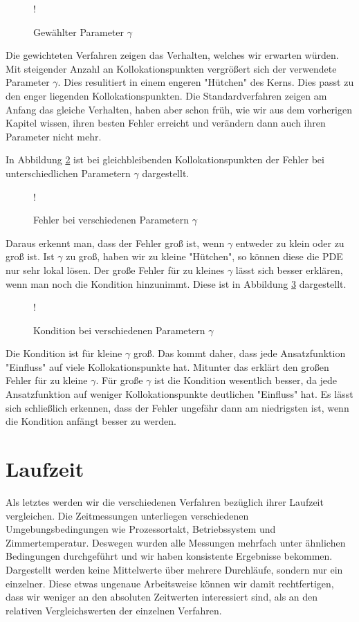 \begin{figure}[ht]
\centering
\resizebox {\columnwidth} {!} {

}
\caption{Gewählter Parameter $\gamma$}
\label{fig:gamma}
\end{figure}

Die gewichteten Verfahren zeigen das Verhalten, welches wir erwarten würden. Mit steigender Anzahl an Kollokationspunkten vergrößert sich der verwendete Parameter $\gamma$. Dies resulitiert in einem engeren "Hütchen" des Kerns. Dies passt zu den enger liegenden Kollokationspunkten. Die Standardverfahren zeigen am Anfang das gleiche Verhalten, haben aber schon früh, wie wir aus dem vorherigen Kapitel wissen, ihren besten Fehler erreicht und verändern dann auch ihren Parameter nicht mehr.

In Abbildung \ref{fig:gamma-fehler} ist bei gleichbleibenden Kollokationspunkten der Fehler bei unterschiedlichen Parametern $\gamma$ dargestellt.

\begin{figure}[ht]
\centering
\resizebox {\columnwidth} {!} {

}
\caption{Fehler bei verschiedenen Parametern $\gamma$}
\label{fig:gamma-fehler}
\end{figure}

Daraus erkennt man, dass der Fehler groß ist, wenn $\gamma$ entweder zu klein oder zu groß ist. Ist $\gamma$ zu groß, haben wir zu kleine "Hütchen", so können diese die \ac{PDE} nur sehr lokal lösen. Der große Fehler für zu kleines $\gamma$ lässt sich besser erklären, wenn man noch die Kondition hinzunimmt. Diese ist in Abbildung \ref{fig:kondition} dargestellt.

\begin{figure}[ht]
\centering
\resizebox {\columnwidth} {!} {

}
\caption{Kondition bei verschiedenen Parametern $\gamma$}
\label{fig:kondition}
\end{figure}

Die Kondition ist für kleine $\gamma$ groß. Das kommt daher, dass jede Ansatzfunktion "Einfluss" auf viele Kollokationspunkte hat. Mitunter das erklärt den großen Fehler für zu kleine $\gamma$. Für große $\gamma$ ist die Kondition wesentlich besser, da jede Ansatzfunktion auf weniger Kollokationspunkte deutlichen "Einfluss" hat. Es lässt sich schließlich erkennen, dass der Fehler ungefähr dann am niedrigsten ist, wenn die Kondition anfängt besser zu werden. 

\section{Laufzeit}
Als letztes werden wir die verschiedenen Verfahren bezüglich ihrer Laufzeit vergleichen. Die Zeitmessungen unterliegen verschiedenen Umgebungsbedingungen wie Prozessortakt, Betriebssystem und Zimmertemperatur. Deswegen wurden alle Messungen mehrfach unter ähnlichen Bedingungen durchgeführt und wir haben konsistente Ergebnisse bekommen. Dargestellt werden keine Mittelwerte über mehrere Durchläufe, sondern nur ein einzelner. Diese etwas ungenaue Arbeitsweise können wir damit rechtfertigen, dass wir weniger an den absoluten Zeitwerten interessiert sind, als an den relativen Vergleichswerten der einzelnen Verfahren.

